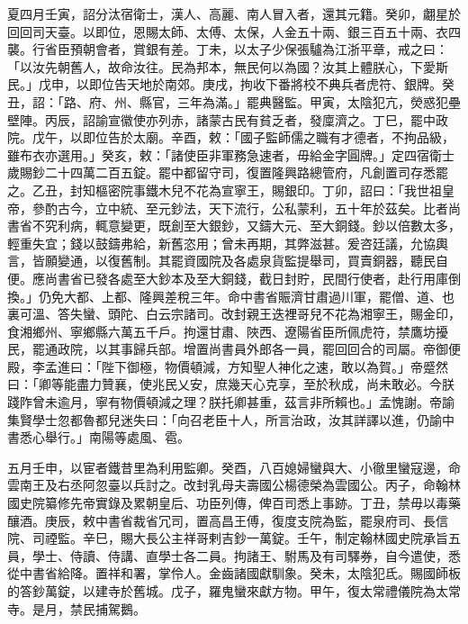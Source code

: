 \begin{pinyinscope}
 夏四月壬寅，詔分汰宿衛士，漢人、高麗、南人冒入者，還其元籍。癸卯，翽星於回回司天臺。以即位，恩賜太師、太傅、太保，人金五十兩、銀三百五十兩、衣四襲。行省臣預朝會者，賞銀有差。丁未，以太子少保張驢為江浙平章，戒之曰：「以汝先朝舊人，故命汝往。民為邦本，無民何以為國？汝其上體朕心，下愛斯民。」戊申，以即位告天地於南郊。庚戌，拘收下番將校不典兵者虎符、銀牌。癸丑，詔：「路、府、州、縣官，三年為滿。」罷典醫監。甲寅，太陰犯亢，熒惑犯壘壁陣。丙辰，詔諭宣徽使亦列赤，諸蒙古民有貧乏者，發廩濟之。丁巳，罷中政院。戊午，以即位告於太廟。辛酉，敕：「國子監師儒之職有才德者，不拘品級，雖布衣亦選用。」癸亥，敕：「諸使臣非軍務急速者，毋給金字圓牌。」定四宿衛士歲賜鈔二十四萬二百五錠。罷中都留守司，復置隆興路總管府，凡創置司存悉罷之。乙丑，封知樞密院事鐵木兒不花為宣寧王，賜銀印。丁卯，詔曰：「我世祖皇帝，參酌古今，立中統、至元鈔法，天下流行，公私蒙利，五十年於茲矣。比者尚書省不究利病，輒意變更，既創至大銀鈔，又鑄大元、至大銅錢。鈔以倍數太多，輕重失宜；錢以鼓鑄弗給，新舊恣用；曾未再期，其弊滋甚。爰咨廷議，允協輿言，皆願變通，以復舊制。其罷資國院及各處泉貨監提舉司，買賣銅器，聽民自便。應尚書省已發各處至大鈔本及至大銅錢，截日封貯，民間行使者，赴行用庫倒換。」仍免大都、上都、隆興差稅三年。命中書省賑濟甘肅過川軍，罷僧、道、也裏可溫、答失蠻、頭陀、白云宗諸司。改封親王迭裡哥兒不花為湘寧王，賜金印，食湘鄉州、寧鄉縣六萬五千戶。拘還甘肅、陜西、遼陽省臣所佩虎符，禁鷹坊擾民，罷通政院，以其事歸兵部。增置尚書員外郎各一員，罷回回合的司屬。帝御便殿，李孟進曰：「陛下御極，物價頓減，方知聖人神化之速，敢以為賀。」帝蹙然曰：「卿等能盡力贊襄，使兆民乂安，庶幾天心克享，至於秋成，尚未敢必。今朕踐阼曾未逾月，寧有物價頓減之理？朕托卿甚重，茲言非所賴也。」孟愧謝。帝諭集賢學士忽都魯都兒迷失曰：「向召老臣十人，所言治政，汝其詳譯以進，仍諭中書悉心舉行。」南陽等處風、雹。



 五月壬申，以宦者鐵昔里為利用監卿。癸酉，八百媳婦蠻與大、小徹里蠻寇邊，命雲南王及右丞阿忽臺以兵討之。改封乳母夫壽國公楊德榮為雲國公。丙子，命翰林國史院纂修先帝實錄及累朝皇后、功臣列傳，俾百司悉上事跡。丁丑，禁毋以毒藥釀酒。庚辰，敕中書省裁省冗司，置高昌王傅，復度支院為監，罷泉府司、長信院、司禋監。辛巳，賜大長公主祥哥剌吉鈔一萬錠。壬午，制定翰林國史院承旨五員，學士、侍讀、侍講、直學士各二員。拘諸王、駙馬及有司驛券，自今遣使，悉從中書省給降。置祥和署，掌伶人。金齒諸國獻馴象。癸未，太陰犯氐。賜國師板的答鈔萬錠，以建寺於舊城。戊子，羅鬼蠻來獻方物。甲午，復太常禮儀院為太常寺。是月，禁民捕駕鵝。




\end{pinyinscope}
